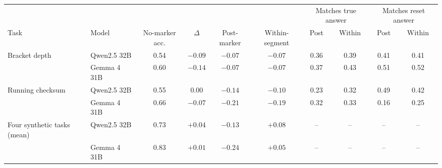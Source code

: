 \begin{tabular}{ll cccc cc cc}
\toprule
& & & & & & \multicolumn{2}{c}{Matches true answer} & \multicolumn{2}{c}{Matches reset answer} \\
\cmidrule(lr){7-8}\cmidrule(lr){9-10}
Task & Model & No-marker acc. & $\Delta$ & Post-marker & Within-segment & Post & Within & Post & Within \\
\midrule
Bracket depth & Qwen2.5 32B & 0.54 & $-0.09$ & $-0.07$ & $-0.07$ & 0.36 & 0.39 & 0.41 & 0.41 \\
 & Gemma 4 31B & 0.60 & $-0.14$ & $-0.07$ & $-0.07$ & 0.37 & 0.43 & 0.51 & 0.52 \\
\addlinespace
Running checksum & Qwen2.5 32B & 0.55 & 0.00 & $-0.14$ & $-0.10$ & 0.23 & 0.32 & 0.49 & 0.42 \\
 & Gemma 4 31B & 0.66 & $-0.07$ & $-0.21$ & $-0.19$ & 0.32 & 0.33 & 0.16 & 0.25 \\
\addlinespace
Four synthetic tasks (mean) & Qwen2.5 32B & 0.73 & $+0.04$ & $-0.13$ & $+0.08$ & -- & -- & -- & -- \\
 & Gemma 4 31B & 0.83 & $+0.01$ & $-0.24$ & $+0.05$ & -- & -- & -- & -- \\
\bottomrule
\end{tabular}
